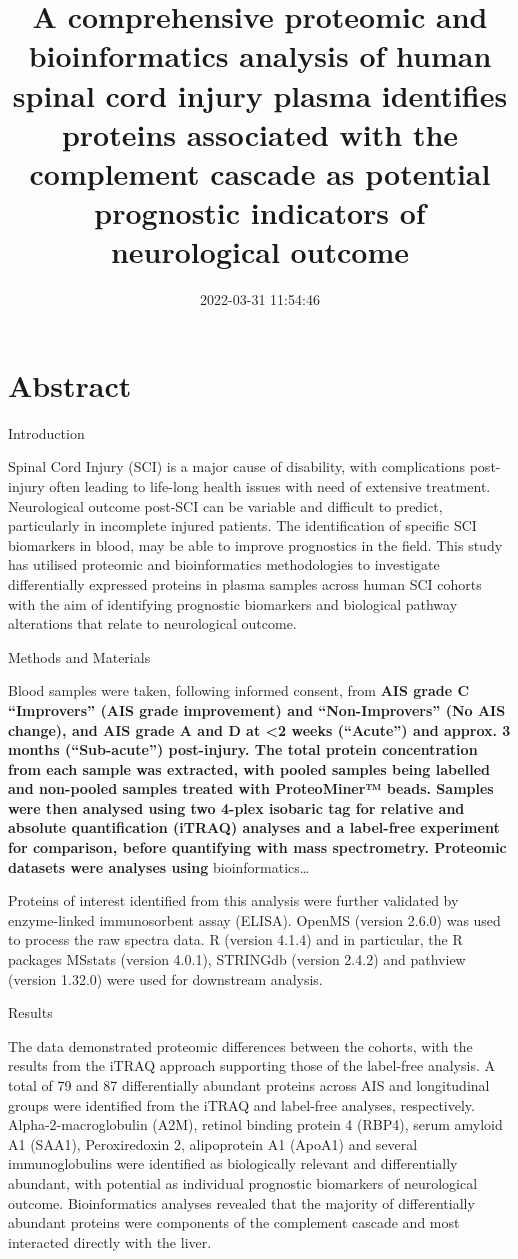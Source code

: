 \documentclass[9pt,lineno]{elife}
\title{A comprehensive proteomic and bioinformatics analysis of human spinal cord injury plasma identifies proteins associated with the complement cascade as potential prognostic indicators of neurological outcome}
\author{}
\date{2022-03-31 11:54:46}
\begin{document}
\maketitle

\hypertarget{abstract}{%
\section{Abstract}\label{abstract}}

Introduction

Spinal Cord Injury (SCI) is a major cause of disability, with complications post-injury often leading to life-long health issues with need of extensive treatment. Neurological outcome post-SCI can be variable and difficult to predict, particularly in incomplete injured patients. The identification of specific SCI biomarkers in blood, may be able to improve prognostics in the field. This study has utilised proteomic and bioinformatics methodologies to investigate differentially expressed proteins in plasma samples across human SCI cohorts with the aim of identifying prognostic biomarkers and biological pathway alterations that relate to neurological outcome.

Methods and Materials

Blood samples were taken, following informed consent, from \textbf{AIS grade C ``Improvers'' (AIS grade improvement) and ``Non-Improvers'' (No AIS change), and AIS grade A and D at \textless2 weeks (``Acute'') and approx. 3 months (``Sub-acute'') post-injury. The total protein concentration from each sample was extracted, with pooled samples being labelled and non-pooled samples treated with ProteoMiner™ beads. Samples were then analysed using two 4-plex isobaric tag for relative and absolute quantification (iTRAQ) analyses and a label-free experiment for comparison, before quantifying with mass spectrometry. Proteomic datasets were analyses using }bioinformatics\ldots{}

Proteins of interest identified from this analysis were further validated by enzyme-linked immunosorbent assay (ELISA).
OpenMS (version 2.6.0) was used to process the raw spectra data.
R (version 4.1.4) and in particular, the R packages MSstats (version 4.0.1), STRINGdb (version 2.4.2) and pathview (version 1.32.0) were used for downstream analysis.

Results

The data demonstrated proteomic differences between the cohorts, with the results from the iTRAQ approach supporting those of the label-free analysis. A total of 79 and 87 differentially abundant proteins across AIS and longitudinal groups were identified from the iTRAQ and label-free analyses, respectively. Alpha-2-macroglobulin (A2M), retinol binding protein 4 (RBP4), serum amyloid A1 (SAA1), Peroxiredoxin 2, alipoprotein A1 (ApoA1) and several immunoglobulins were identified as biologically relevant and differentially abundant, with potential as individual prognostic biomarkers of neurological outcome. Bioinformatics analyses revealed that the majority of differentially abundant proteins were components of the complement cascade and most interacted directly with the liver.
\end{document}
